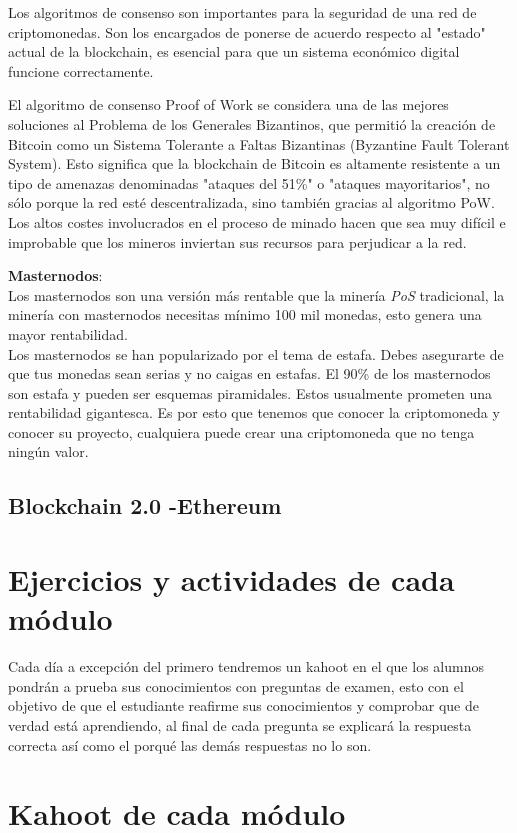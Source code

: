 \documentclass[a4paper,12pt]{lib/pub}
\begin{document}
Los algoritmos de consenso son importantes para la seguridad de una red de criptomonedas. Son los encargados de ponerse de acuerdo respecto al "estado" actual de la blockchain, es esencial para que un sistema económico digital funcione correctamente. 

El algoritmo de consenso Proof of Work se considera una de las mejores soluciones al Problema de los Generales Bizantinos, que permitió la creación de Bitcoin como un Sistema Tolerante a Faltas Bizantinas (Byzantine Fault Tolerant System). Esto significa que la blockchain de Bitcoin es altamente resistente a un tipo de amenazas denominadas "ataques del 51\%" o "ataques mayoritarios", no sólo porque la red esté descentralizada, sino también gracias al algoritmo PoW. Los altos costes involucrados en el proceso de minado hacen que sea muy difícil e improbable que los mineros inviertan sus recursos para perjudicar a la red.

\textbf{Masternodos}:\\
Los masternodos son una versión más rentable que la minería \textit{PoS} tradicional, la minería con masternodos necesitas mínimo 100 mil monedas, esto genera una mayor rentabilidad.\\
Los masternodos se han popularizado por el tema de estafa. Debes asegurarte de que tus monedas sean serias y no caigas en estafas. El 90\% de los masternodos son estafa y pueden ser esquemas piramidales. Estos usualmente prometen una rentabilidad gigantesca. Es por esto que tenemos que conocer la criptomoneda y conocer su proyecto, cualquiera puede crear una criptomoneda que no tenga ningún valor.
\subsection{Blockchain 2.0 -Ethereum}

\section{Ejercicios y actividades de cada módulo}
Cada día a excepción del primero tendremos un kahoot en el que los alumnos pondrán a prueba sus conocimientos con preguntas de examen, esto con el objetivo de que el estudiante reafirme sus conocimientos y comprobar que de verdad está aprendiendo, al final de cada pregunta se explicará la respuesta correcta así como el porqué las demás respuestas no lo son.

\section{Kahoot de cada módulo}
\end{document}
